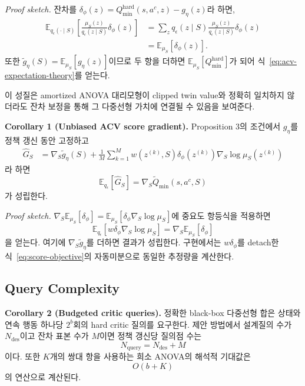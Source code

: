 \documentclass[10pt,journal]{IEEEtran}
\newcommand{\E}{\mathbb{E}}
\begin{document}
\noindent\emph{Proof sketch.}
잔차를
$\delta_\phi(z)=Q_{\min}^{\mathrm{hard}}(s,a^c,z)-g_\eta(z)$라 하면,
\begin{align}
\E_{q_\epsilon(\cdot\mid S)}
\left[
\frac{\mu_S(z)}{q_\epsilon(z\mid S)}
\delta_\phi(z)
\right]
&=
\sum_z
q_\epsilon(z\mid S)
\frac{\mu_S(z)}{q_\epsilon(z\mid S)}
\delta_\phi(z)
\nonumber\\
&=
\E_{\mu_S}[\delta_\phi(z)].
\end{align}
또한
$\widetilde g_\eta(S)=\E_{\mu_S}[g_\eta(z)]$이므로 두 항을 더하면
$\E_{\mu_S}[Q_{\min}^{\mathrm{hard}}]$가 되어
식~\eqref{eq:acv-expectation-theory}를 얻는다.

이 성질은 amortized ANOVA 대리모형이 clipped twin value와 정확히 일치하지 않더라도 잔차 보정을 통해 그 다중선형 가치에 연결될 수 있음을 보여준다.

\noindent\textbf{Corollary 1 (Unbiased ACV score gradient).}
Proposition 3의 조건에서 $g_\eta$를 정책 갱신 동안 고정하고
\begin{align}
\widehat G_S
&=\nabla_S\widetilde g_\eta(S)
 +\frac{1}{M}\sum_{k=1}^{M}
 w(z^{(k)},S)\delta_\phi(z^{(k)})
 \nabla_S\log\mu_S(z^{(k)})
\label{eq:acv-gradient-theory}
\end{align}
라 하면
\begin{equation}
\E_{q_\epsilon}[\widehat G_S]
=\nabla_S\widetilde Q_{\min}(s,a^c,S)
\end{equation}
가 성립한다.

\noindent\emph{Proof sketch.}
$\nabla_S\E_{\mu_S}[\delta_\phi]
=\E_{\mu_S}[\delta_\phi\nabla_S\log\mu_S]$에 중요도 항등식을 적용하면
\begin{equation}
\E_{q_\epsilon}\!\left[
w\delta_\phi\nabla_S\log\mu_S
\right]
=\nabla_S\E_{\mu_S}[\delta_\phi]
\end{equation}
을 얻는다. 여기에 $\nabla_S\widetilde g_\eta$를 더하면 결과가 성립한다.
구현에서는 $w\delta_\phi$를 detach한 식~\eqref{eq:score-objective}의
자동미분으로 동일한 추정량을 계산한다.


\subsection{Query Complexity}

\noindent\textbf{Corollary 2 (Budgeted critic queries).}
정확한 black-box 다중선형 합은 상태와 연속 행동 하나당 $2^b$회의 hard critic 질의를 요구한다. 제안 방법에서 설계질의 수가 $N_{\mathrm{des}}$이고 잔차 표본 수가 $M$이면 정책 갱신당 질의점 수는
\begin{equation}
N_{\mathrm{query}}
=
N_{\mathrm{des}}+M
\end{equation}
이다. 또한 $K$개의 쌍대 항을 사용하는 희소 ANOVA의 해석적 기대값은
\begin{equation}
O(b+K)
\end{equation}
의 연산으로 계산된다.
\end{document}
